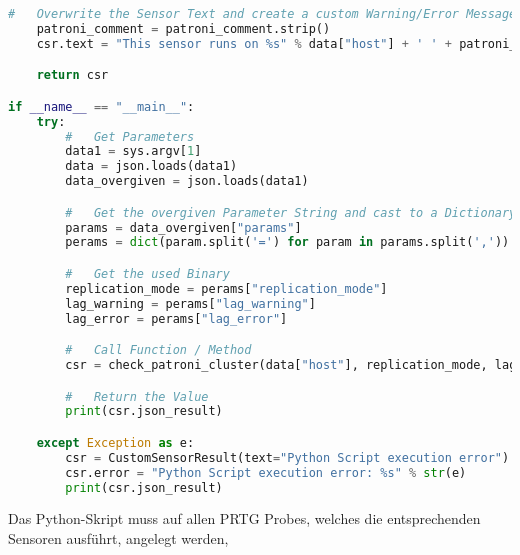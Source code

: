 \begin{flushleft}
\begin{lstlisting}[language=python, caption=Monitoring - KSGR - Patroni - Healthcheck.py,captionpos=b,label={lst:monitoring-python},breaklines=true]
    #   Overwrite the Sensor Text and create a custom Warning/Error Message
    patroni_comment = patroni_comment.strip()
    csr.text = "This sensor runs on %s" % data["host"] + ' ' + patroni_comment

    return csr

if __name__ == "__main__":
    try:
        #   Get Parameters
        data1 = sys.argv[1]
        data = json.loads(data1)
        data_overgiven = json.loads(data1)

        #   Get the overgiven Parameter String and cast to a Dictionary
        params = data_overgiven["params"]
        perams = dict(param.split('=') for param in params.split(','))

        #   Get the used Binary
        replication_mode = perams["replication_mode"]
        lag_warning = perams["lag_warning"]
        lag_error = perams["lag_error"]

        #   Call Function / Method
        csr = check_patroni_cluster(data["host"], replication_mode, lag_warning, lag_error)

        #   Return the Value
        print(csr.json_result)

    except Exception as e:
        csr = CustomSensorResult(text="Python Script execution error")
        csr.error = "Python Script execution error: %s" % str(e)
        print(csr.json_result)
    \end{lstlisting}
\end{flushleft}
\begin{flushleft}
    Das Python-Skript muss auf allen \Gls{PRTG} Probes, welches die entsprechenden Sensoren ausführt, angelegt werden,
\end{flushleft}